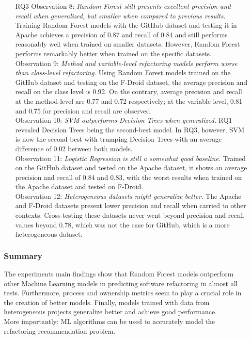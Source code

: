 \begin{itemize}
    \item[RQ3] Observation 8: \textit{Random Forest still presents excellent precision and recall when generalized, but smaller when compared to previous results.} Training Random Forest models with the GitHub dataset and testing it in Apache achieves a precision of 0.87 and recall of 0.84 and still performs reasonably well when trained on smaller datasets. However, Random Forest performs remarkably better when trained on the specific datasets.\\Observation 9: \textit{Method and variable-level refactoring models perform worse than class-level refactoring.} Using Random Forest models trained on the GitHub dataset and testing on the F-Droid dataset, the average precision and recall on the class level is 0.92. On the contrary, average precision and recall at the method-level are 0.77 and 0,72 respectively; at the variable level, 0.81 and 0.75 for precision and recall are observed.\\ Observation 10: \textit{SVM outperforms Decision Trees when generalized.} RQ1 revealed Decision Trees being the second-best model. In RQ3, however, SVM is now the second best with trumping Decision Trees with an average difference of 0.02 between both models.\\ Observation 11: \textit{Logistic Regression is still a somewhat good baseline.} Trained on the GitHub dataset and tested on the Apache dataset, it shows an average precision and recall of 0.84 and 0.83, with the worst results when trained on the Apache dataset and tested on F-Droid. \\ Observation 12: \textit{Heterogeneous datasets might generalize better.} The Apache and F-Droid datasets present lower precision and recall when carried to other contexts. Cross-testing these datasets never went beyond precision and recall values beyond 0.78, which was not the case for GitHub, which is a more heterogeneous dataset.
\end{itemize}
\subsubsection{Summary}
The experiments main findings show that Random Forest models outperform other Machine Learning models in predicting software refactoring in almost all tests. Furthermore, process and ownership metrics seem to play a crucial role in the creation of better models. Finally, models trained with data from heterogeneous projects generalize better and achieve good performance.\\
More importantly: ML algorithms can be used to accurately model the refactoring recommendation problem.
